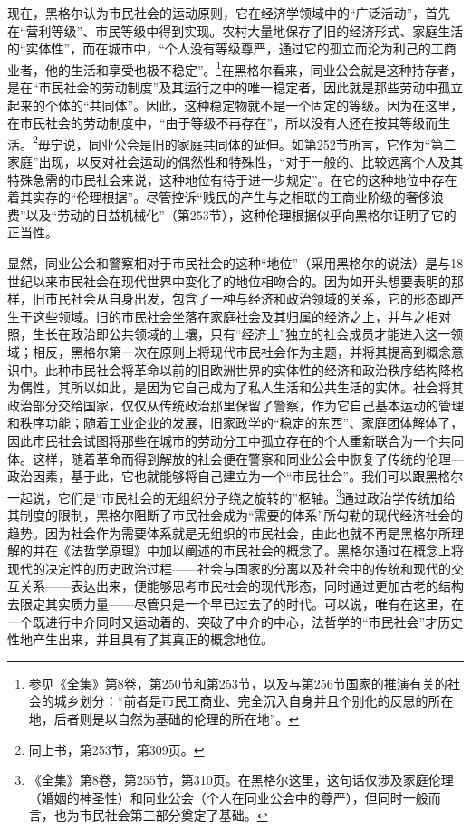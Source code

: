 现在，黑格尔认为市民社会的运动原则，它在经济学领域中的“广泛活动”，首先在“营利等级”、市民等级中得到实现。农村大量地保存了旧的经济形式、家庭生活的“实体性”，而在城市中，“个人没有等级尊严，通过它的孤立而沦为利己的工商业者，他的生活和享受也极不稳定”。\footnote{参见《全集》第8卷，第250节和第253节，以及与第256节国家的推演有关的社会的城乡划分：“前者是市民工商业、完全沉入自身并且个别化的反思的所在地，后者则是以自然为基础的伦理的所在地”。}在黑格尔看来，同业公会就是这种持存者，是在“市民社会的劳动制度”及其运行之中的唯一稳定者，因此就是那些劳动中孤立起来的个体的“共同体”。因此，这种稳定物就不是一个固定的等级。因为在这里，在市民社会的劳动制度中，“由于等级不再存在”，所以没有人还在按其等级而生活。\footnote{同上书，第253节，第309页。}毋宁说，同业公会是旧的家庭共同体的延伸。如第252节所言，它作为“第二家庭”出现，以反对社会运动的偶然性和特殊性，“对于一般的、比较远离个人及其特殊急需的市民社会来说，这种地位有待于进一步规定”。在它的这种地位中存在着其实存的“伦理根据”。尽管控诉“贱民的产生与之相联的工商业阶级的奢侈浪费”以及“劳动的日益机械化”（第253节），这种伦理根据似乎向黑格尔证明了它的正当性。

显然，同业公会和警察相对于市民社会的这种“地位”（采用黑格尔的说法）是与18世纪以来市民社会在现代世界中变化了的地位相吻合的。因为如开头想要表明的那样，旧市民社会从自身出发，包含了一种与经济和政治领域的关系，它的形态即产生于这些领域。旧的市民社会坐落在家庭社会及其归属的经济之上，并与之相对照，生长在政治即公共领域的土壤，只有“经济上”独立的社会成员才能进入这一领域；相反，黑格尔第一次在原则上将现代市民社会作为主题，并将其提高到概念意识中。此种市民社会将革命以前的旧欧洲世界的实体性的经济和政治秩序结构降格为偶性，其所以如此，是因为它自己成为了私人生活和公共生活的实体。社会将其政治部分交给国家，仅仅从传统政治那里保留了警察，作为它自己基本运动的管理和秩序功能；随着工业企业的发展，旧家政学的“稳定的东西”、家庭团体解体了，因此市民社会试图将那些在城市的劳动分工中孤立存在的个人重新联合为一个共同体。这样，随着革命而得到解放的社会便在警察和同业公会中恢复了传统的伦理—政治因素，基于此，它也就能够将自己建立为一个“市民社会”。我们可以跟黑格尔一起说，它们是“市民社会的无组织分子绕之旋转的”枢轴。\footnote{《全集》第8卷，第255节，第310页。在黑格尔这里，这句话仅涉及家庭伦理（婚姻的神圣性）和同业公会（个人在同业公会中的尊严），但同时一般而言，也为市民社会第三部分奠定了基础。}通过政治学传统加给其制度的限制，黑格尔阻断了市民社会成为“需要的体系”所勾勒的现代经济社会的趋势。因为社会作为需要体系就是无组织的市民社会，由此也就不再是黑格尔所理解的并在《法哲学原理》中加以阐述的市民社会的概念了。黑格尔通过在概念上将现代的决定性的历史政治过程——社会与国家的分离以及社会中的传统和现代的交互关系——表达出来，便能够思考市民社会的现代形态，同时通过更加古老的结构去限定其实质力量——尽管只是一个早已过去了的时代。可以说，唯有在这里，在一个既进行中介同时又运动着的、突破了中介的中心，法哲学的“市民社会”才历史性地产生出来，并且具有了其真正的概念地位。
